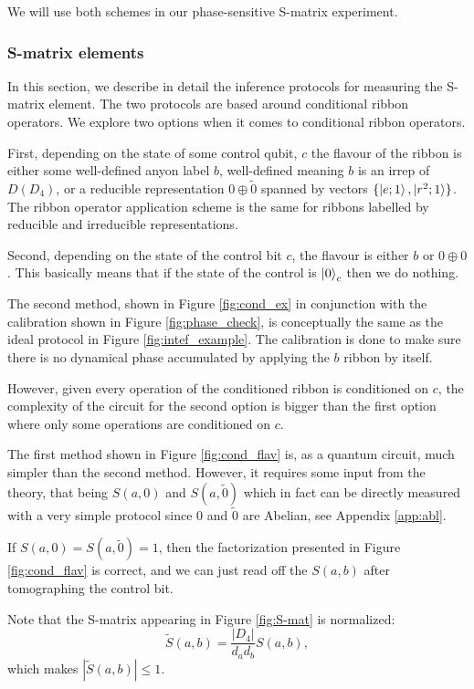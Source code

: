 \documentclass[two column]{article}
\begin{document}
We will use both schemes in our phase-sensitive S-matrix experiment.

\subsubsection{S-matrix elements}

In this section, we describe in detail the inference protocols for measuring the S-matrix element.
The two protocols are based around conditional ribbon operators.
We explore two options when it comes to conditional ribbon operators.

First, depending on the state of some control qubit, $c$ the flavour of the ribbon is either some well-defined anyon label $b$, well-defined meaning $b$ is an irrep of $D(D_4)$, or a reducible representation $0\oplus\tilde{0}$ spanned by vectors $\{\ket{e;1}, \ket{r^2;1}\}$.
The ribbon operator application scheme is the same for ribbons labelled by reducible and irreducible representations.

Second, depending on the state of the control bit $c$, the flavour is either $b$ or $0\oplus 0$. This basically means that if the state of the control is $\ket{0}_c$ then we do nothing.

The second method, shown in Figure \ref{fig:cond_ex} in conjunction with the calibration shown in Figure \ref{fig:phase_check},  is conceptually the same as the ideal protocol in Figure \ref{fig:intef_example}. 
The calibration is done to make sure there is no dynamical phase accumulated by applying the $b$ ribbon by itself.

However, given every operation of the conditioned ribbon is conditioned on $c$, the complexity of the circuit for the second option is bigger than the first option where only some operations are conditioned on $c$.

The first method shown in Figure \ref{fig:cond_flav} is, as a quantum circuit, much simpler than the second method. 
However, it requires some input from the theory, that being $S(a, 0)$ and $S(a, \tilde{0})$ which in fact can be directly measured with a very simple protocol since $0$ and $\tilde{0}$ are Abelian, see Appendix \ref{app:abl}.

If $S(a, 0) = S(a, \tilde{0}) = 1$, then the factorization presented in Figure \ref{fig:cond_flav} is correct, and we can just read off the $S(a,b)$ after tomographing the control bit.

Note that the S-matrix appearing in Figure \ref{fig:S-mat} is normalized:
\begin{equation}
    \tilde{S}(a,b) = \frac{|D_4|}{d_a d_b}S(a,b),
\end{equation}
which makes $|\tilde{S}(a,b)| \leq 1$.
\end{document}
